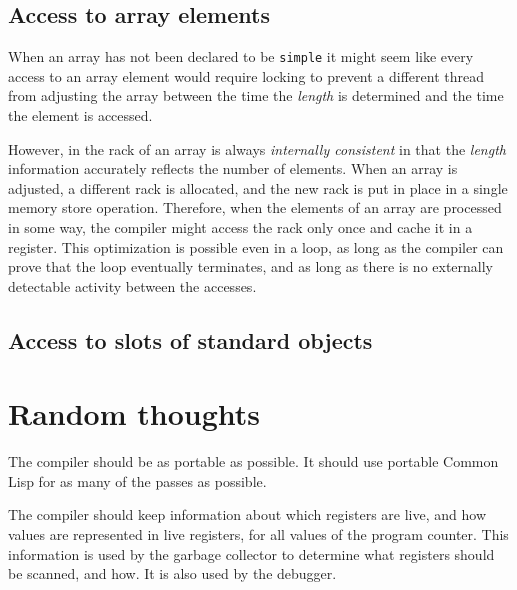 \subsection{Access to array elements}

When an array has not been declared to be \texttt{simple} it might
seem like every access to an array element would require locking to
prevent a different thread from adjusting the array between the time
the \emph{length} is determined and the time the element is accessed.

However, in \sysname{} the rack of an array is always
\emph{internally consistent} in that the \emph{length} information
accurately reflects the number of elements.  When an array is
adjusted, a different rack is allocated, and the new
rack is put in place in a single memory store operation.
Therefore, when the elements of an array are processed in some way,
the compiler might access the rack only once and cache it
in a register.  This optimization is possible even in a loop, as long
as the compiler can prove that the loop eventually terminates, and as
long as there is no externally detectable activity between the
accesses. 

\subsection{Access to slots of standard objects}

\section{Random thoughts}

The compiler should be as portable as possible.  It should use
portable Common Lisp for as many of the passes as possible.  

The compiler should keep information about which registers are live,
and how values are represented in live registers, for all values of
the program counter.  This information is used by the garbage
collector to determine what registers should be scanned, and how.   It
is also used by the debugger.  

